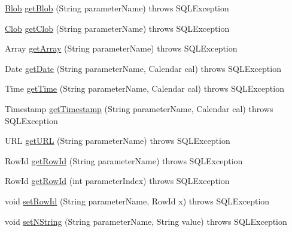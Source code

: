 \begin{DoxyCompactItemize}
\item 
\mbox{\hyperlink{classcom_1_1mysql_1_1cj_1_1jdbc_1_1_blob}{Blob}} \mbox{\hyperlink{classcom_1_1mysql_1_1cj_1_1jdbc_1_1_callable_statement_wrapper_a2b12fc6b7d41574fee85d3d29bdac1ae}{get\+Blob}} (String parameter\+Name)  throws S\+Q\+L\+Exception 
\item 
\mbox{\hyperlink{classcom_1_1mysql_1_1cj_1_1jdbc_1_1_clob}{Clob}} \mbox{\hyperlink{classcom_1_1mysql_1_1cj_1_1jdbc_1_1_callable_statement_wrapper_addab29ed70d9401251f7c06fd04544da}{get\+Clob}} (String parameter\+Name)  throws S\+Q\+L\+Exception 
\item 
Array \mbox{\hyperlink{classcom_1_1mysql_1_1cj_1_1jdbc_1_1_callable_statement_wrapper_af2332647da6d6ae32a12137c3236111f}{get\+Array}} (String parameter\+Name)  throws S\+Q\+L\+Exception 
\item 
Date \mbox{\hyperlink{classcom_1_1mysql_1_1cj_1_1jdbc_1_1_callable_statement_wrapper_a19f1375d9f558bc8d13e2e343a06f46b}{get\+Date}} (String parameter\+Name, Calendar cal)  throws S\+Q\+L\+Exception 
\item 
Time \mbox{\hyperlink{classcom_1_1mysql_1_1cj_1_1jdbc_1_1_callable_statement_wrapper_a01c9e9f2e6c9c990ad0078651fbbc583}{get\+Time}} (String parameter\+Name, Calendar cal)  throws S\+Q\+L\+Exception 
\item 
Timestamp \mbox{\hyperlink{classcom_1_1mysql_1_1cj_1_1jdbc_1_1_callable_statement_wrapper_a5f49b8fd25a3d99b225ae1c7a8b6669d}{get\+Timestamp}} (String parameter\+Name, Calendar cal)  throws S\+Q\+L\+Exception 
\item 
U\+RL \mbox{\hyperlink{classcom_1_1mysql_1_1cj_1_1jdbc_1_1_callable_statement_wrapper_a61e5e0b9815931dbf92c57ad246fcdcf}{get\+U\+RL}} (String parameter\+Name)  throws S\+Q\+L\+Exception 
\item 
Row\+Id \mbox{\hyperlink{classcom_1_1mysql_1_1cj_1_1jdbc_1_1_callable_statement_wrapper_ab13ba2b030b4633c90f4ff764d466c7d}{get\+Row\+Id}} (String parameter\+Name)  throws S\+Q\+L\+Exception 
\item 
Row\+Id \mbox{\hyperlink{classcom_1_1mysql_1_1cj_1_1jdbc_1_1_callable_statement_wrapper_abb6bffb51f12728815f6a5e35ed0038b}{get\+Row\+Id}} (int parameter\+Index)  throws S\+Q\+L\+Exception 
\item 
void \mbox{\hyperlink{classcom_1_1mysql_1_1cj_1_1jdbc_1_1_callable_statement_wrapper_a06fb28a492e2d132899b38498db870ee}{set\+Row\+Id}} (String parameter\+Name, Row\+Id x)  throws S\+Q\+L\+Exception 
\item 
void \mbox{\hyperlink{classcom_1_1mysql_1_1cj_1_1jdbc_1_1_callable_statement_wrapper_a541d6ad71c70ca117fad5b601fbc332b}{set\+N\+String}} (String parameter\+Name, String value)  throws S\+Q\+L\+Exception 

\end{DoxyCompactItemize}
